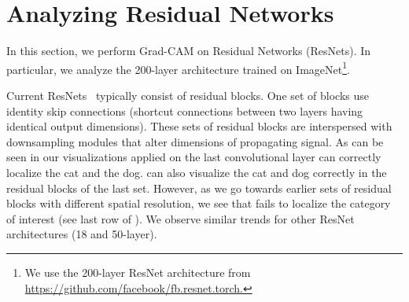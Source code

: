 \vspace{-18pt}
\section{Analyzing Residual Networks}\label{sec:sup_resnet_analysis}
\vspace{-5pt}


In this section, we perform Grad-CAM on Residual Networks (ResNets). In particular, we analyze the 200-layer architecture trained on ImageNet\footnote{We use the 200-layer ResNet architecture from \url{https://github.com/facebook/fb.resnet.torch.}}.

Current ResNets~\cite{he_cvpr15} typically consist of residual blocks.
One set of blocks use identity skip connections (shortcut connections between two layers having identical output dimensions).
These sets of residual blocks are interspersed with downsampling modules that alter dimensions of propagating signal.
As can be seen in  our visualizations applied on the last convolutional layer can correctly localize the cat and the dog.
\gcam{} can also visualize the cat and dog correctly in the residual blocks of the last set.
However, as we go towards earlier sets of residual blocks with different spatial resolution, we see that \gcam{} fails to localize the category of interest (see last row of ).
We observe similar trends for other ResNet architectures (18 and 50-layer).



